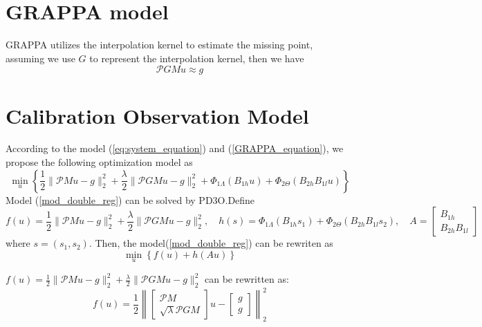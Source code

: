 \documentclass[UTF8]{article}
\begin{document}
\section{GRAPPA model}
\par GRAPPA utilizes the interpolation kernel to estimate the missing point, assuming we use $G$ to represent the interpolation kernel, then we have
\begin{equation} \label{GRAPPA_equation}
	\mathcal{P}GMu \approx g
\end{equation}

\section{Calibration Observation Model}
\par According to the model (\ref{eq:system_equation}) and (\ref{GRAPPA_equation}), we propose the following optimization model as
\begin{equation}\label{mod_double_reg}
	\min_{u} \left\{\frac{1}{2}\|\mathcal{P}Mu-g\|_2^2+  \frac{\lambda}{2}\|\mathcal{P}GMu-g \|_2^2 + \Phi_{1 \Lambda}(B_{1h} u) + \Phi_{2 \Theta}(B_{2h}B_{1l} u) \right\} 
\end{equation}
Model (\ref{mod_double_reg}) can be solved by PD3O.Define 
\begin{equation*}
	f(u) = \frac{1}{2}\|\mathcal{P}Mu-g\|_2^2+  \frac{\lambda}{2}\|\mathcal{P}GMu-g \|_2^2, \quad h(s) = \Phi_{1 \Lambda}(B_{1h} s_1) + \Phi_{2 \Theta}(B_{2h}B_{1l} s_2),\quad A = \begin{bmatrix}
		B_{1h} \\
		B_{2h}B_{1l}
	\end{bmatrix}
\end{equation*}
where $s = (s_1, s_2)$. Then, the model(\ref{mod_double_reg}) can be rewriten as 
\begin{equation}
	\min_{u} \left\{ f(u) + h(Au) \right\}
\end{equation}
\par  $f(u) = \frac{1}{2}\|\mathcal{P}Mu-g\|_2^2+  \frac{\lambda}{2}\|\mathcal{P}GMu-g \|_2^2$ can be rewritten as:
\begin{equation}\label{eq:fun}
	f(u) = \frac{1}{2}\left 
	\|\begin{bmatrix}
		\mathcal{P}M \\
		\sqrt{\lambda}\mathcal{P}GM 
	\end{bmatrix} u - 
	\begin{bmatrix}
		g \\ g
	\end{bmatrix}
	\right \|_2^2
\end{equation}
\end{document}
